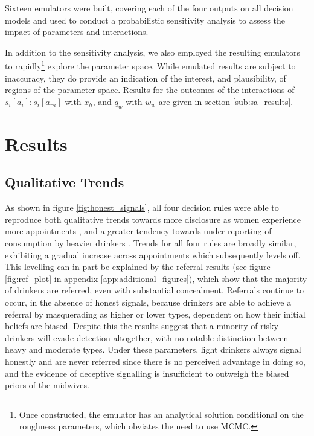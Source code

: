 \documentclass[graybox]{svmult}
\begin{document}
Sixteen emulators were built, covering each of the four outputs on all decision models and used to conduct a probabilistic sensitivity analysis to assess the impact of parameters and interactions.

In addition to the sensitivity analysis, we also employed the resulting emulators to rapidly\footnote{Once constructed, the emulator has an analytical solution conditional on the roughness parameters, which obviates the need to use MCMC.} explore the parameter space. While emulated results are subject to inaccuracy, they do provide an indication of the interest, and plausibility, of regions of the parameter space. Results for the outcomes of the interactions of \(s_{i}[a_{i}]:s_{i}[a_{\neg i}]\) with \(x_{h}\), and \(q_{w}\) with \(w_{w}\) are given in section \ref{sub:sa_results}. 
\section{Results}
\label{sec:results}


\subsection{Qualitative Trends}
\label{sub:qt_results}

As shown in figure \ref{fig:honest_signals}, all four decision rules were able to reproduce both qualitative trends towards more disclosure as women experience more appointments \citep{Phillips2007}, and a greater tendency towards under reporting of consumption by heavier drinkers \citep{Alvik2006}.  
Trends for all four rules are broadly similar, exhibiting a gradual increase across appointments which subsequently levels off. This levelling can in part be explained by the referral results (see figure \ref{fig:ref_plot} in appendix \ref{app:additional_figures}), which show that the majority of drinkers are referred, even with substantial concealment. Referrals continue to occur, in the absence of honest signals, because drinkers are able to achieve a referral by masquerading as higher or lower types, dependent on how their initial beliefs are biased. Despite this the results suggest that a minority of risky drinkers will evade detection altogether, with no notable distinction between heavy and moderate types. Under these parameters, light drinkers always signal honestly and are never referred since there is no perceived advantage in doing so, and the evidence of deceptive signalling is insufficient to outweigh the biased priors of the midwives. 
\end{document}
